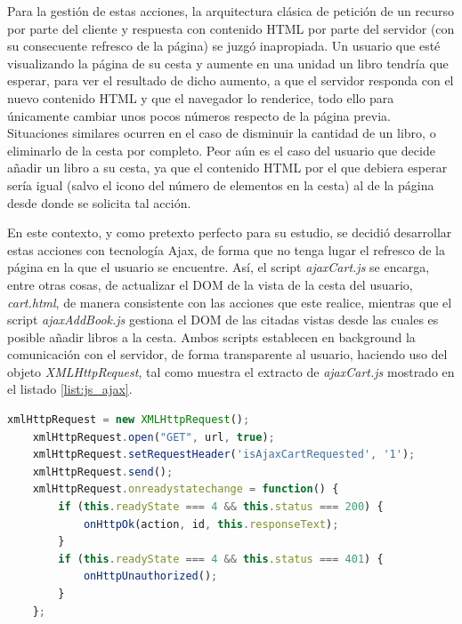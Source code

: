 \documentclass[a4paper]{article}
\begin{document}
    Para la gestión de estas acciones, la arquitectura clásica de petición de un recurso por parte del cliente y respuesta con contenido HTML por parte del servidor (con su consecuente refresco de la página) se juzgó inapropiada. Un usuario que esté visualizando la página de su cesta y aumente en una unidad un libro tendría que esperar, para ver el resultado de dicho aumento, a que el servidor responda con el nuevo contenido HTML y que el navegador lo renderice, todo ello para únicamente cambiar unos pocos números respecto de la página previa. Situaciones similares ocurren en el caso de disminuir la cantidad de un libro, o eliminarlo de la cesta por completo. Peor aún es el caso del usuario que decide añadir un libro a su cesta, ya que el contenido HTML por el que debiera esperar sería igual (salvo el icono del número de elementos en la cesta) al de la página desde donde se solicita tal acción.
    
    En este contexto, y como pretexto perfecto para su estudio, se decidió desarrollar estas acciones con tecnología Ajax, de forma que no tenga lugar el refresco de la página en la que el usuario se encuentre. Así, el script \emph{ajaxCart.js} se encarga, entre otras cosas, de actualizar el DOM de la vista de la cesta del usuario, \emph{cart.html}, de manera consistente con las acciones que este realice, mientras que el script \emph{ajaxAddBook.js} gestiona el DOM de las citadas vistas desde las cuales es posible añadir libros a la cesta. Ambos scripts establecen en background la comunicación con el servidor, de forma transparente al usuario, haciendo uso del objeto \emph{XMLHttpRequest}, tal como muestra el extracto de \emph{ajaxCart.js} mostrado en el listado \ref{list:js_ajax}.
    \\
    
    \begin{lstlisting}[language=JavaScript,caption=Comunicación Ajax con el servidor,label=list:js_ajax]
    xmlHttpRequest = new XMLHttpRequest();
    xmlHttpRequest.open("GET", url, true);
    xmlHttpRequest.setRequestHeader('isAjaxCartRequested', '1');
    xmlHttpRequest.send();
    xmlHttpRequest.onreadystatechange = function() {
    	if (this.readyState === 4 && this.status === 200) {
    		onHttpOk(action, id, this.responseText);
    	}
    	if (this.readyState === 4 && this.status === 401) {
    		onHttpUnauthorized();
    	}
    };
    \end{lstlisting}
    
\end{document}
